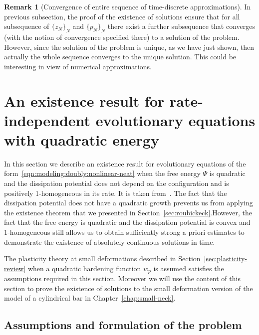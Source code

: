 \documentclass[a4paper,10pt,oneside]{amsbook}
\numberwithin{section}{chapter}
\numberwithin{equation}{chapter}
\theoremstyle{definition}
\newtheorem{rmk}[prop]{Remark}
\begin{document}
\begin{rmk}[Convergence of entire sequence of time-discrete approximations]
In previous subsection, the proof of the existence of solutions ensure that for all subsequence of $\{z_N\}_N$ and $\{p_N\}_N$ there exist a further subsequence that converges (with the notion of convergence specified there) to a solution of the problem. However, since the solution of the problem is unique, as we have just shown, then actually the whole sequence converges to the unique solution. This could be interesting in view of numerical approximations.
\end{rmk}

\section{An existence result for rate-independent evolutionary equations with quadratic energy}
\label{sec:evi}

In this section we describe an existence result for evolutionary equations of the form~\eqref{eqn:modeling:doubly:nonlinear-neat} when the free energy $\Psi$ is quadratic and the dissipation potential does not depend on the configuration and is positively 1-homogeneous in its rate. It is taken from~\cite{han-reddy}. The fact that the dissipation potential does not have a quadratic growth prevents us from applying the existence theorem that we presented in Section~\ref{sec:roubickeck}.However, the fact that the free energy is quadratic and the dissipation potential is convex and 1-homogeneous still allows us to obtain sufficiently strong a priori estimates to demonstrate the existence of absolutely continuous solutions in time.

The plasticity theory at small deformations described in Section~\ref{sec:plasticity-review} when a quadratic hardening function $w_p$ is assumed satisfies the assumptions required in this section. Moreover we will use the content of this section to prove the existence of solutions to the small deformation version of the model of a cylindrical bar in Chapter~\ref{chap:small-neck}.

\subsection{Assumptions and formulation of the problem}
\end{document}
